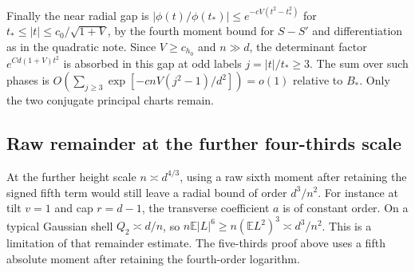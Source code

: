 Finally the near radial gap is $|\phi(t)/\phi(t_*)|\le e^{-c V(t^2-t_*^2)}$ for $t_*\le|t|\le c_0/\sqrt{1+V}$, by the fourth moment bound for $S-S'$ and differentiation as in the quadratic note. Since $V\ge c_{h_0}$ and $n\gg d$, the determinant factor $e^{Cd(1+V)t^2}$ is absorbed in this gap at odd labels $j=|t|/t_*\ge3$. The sum over such phases is $O(\sum_{j\ge3}\exp[-cnV(j^2-1)/d^2])=o(1)$ relative to $B_*$. Only the two conjugate principal charts remain.

\subsection{Raw remainder at the further four-thirds scale}

At the further height scale $n\asymp d^{4/3}$, using a raw sixth moment after retaining the signed fifth term would still leave a radial bound of order $d^3/n^2$. For instance at tilt $v=1$ and cap $r=d-1$, the transverse coefficient $a$ is of constant order. On a typical Gaussian shell $Q_2\asymp d/n$, so $n\mathbb E|L|^6\ge n(\mathbb E L^2)^3\asymp d^3/n^2$. This is a limitation of that remainder estimate. The five-thirds proof above uses a fifth absolute moment after retaining the fourth-order logarithm.
